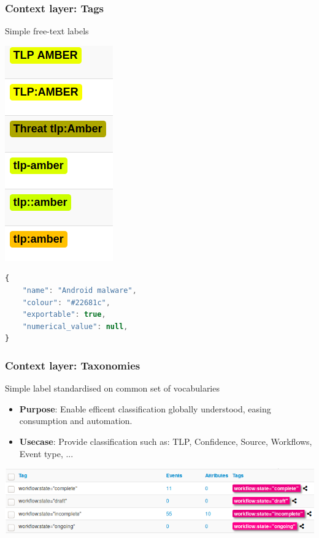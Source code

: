 \begin{frame}[fragile]
    \frametitle{Context layer: Tags}
    Simple free-text labels
    \begin{center}
        \includegraphics[scale=0.45]{screenshots/creativity.png}
    \end{center}
    \begin{lstlisting}[language=javascript,firstnumber=1]
{
    "name": "Android malware",
    "colour": "#22681c",
    "exportable": true,
    "numerical_value": null,
}
\end{lstlisting}
\end{frame}

\begin{frame}
    \frametitle{Context layer: Taxonomies}
    Simple label standardised on common set of vocabularies
    \begin{itemize}
        \item[] \textbf{Purpose}: Enable efficent classification globally understood, easing consumption and automation.
        \item[] \textbf{Usecase}: Provide classification such as: TLP, Confidence, Source, Workflows, Event type, ...
    \end{itemize}
    \vspace{1em}
    \begin{center}
        \includegraphics[width=1.0\linewidth]{taxonomy-workflow.png}
    \end{center}
\end{frame}

